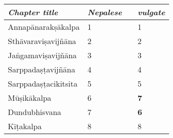 \documentclass{book}
\begin{document}
   \thispagestyle{empty} 
 
    \begin{table}[h]
        \centering
        \begin{tabular}{lll@{}l}
            \emph{Chapter title} & \emph{Nepalese} && \emph{vulgate}   \\
            \midrule
            Annapānarakṣākalpa   &  1 &&  1 \\
            Sthāvaraviṣavijñāna & 2 &&  2\\
            Jaṅgamaviṣavijñāna &  3 && 3 \\
            Sarppadaṣṭavijñāna & 4  &&  4 \\
            Sarppadaṣṭacikitsita & 5 && 5 \\
            Mūṣikākalpa &  {6} && \textbf{7} \\
            Dundubhisvana & {7} && \textbf{6} \\
            Kīṭakalpa & 8 && 8 \\
            \bottomrule  
        \end{tabular}
    \end{table}
    
\end{document}
